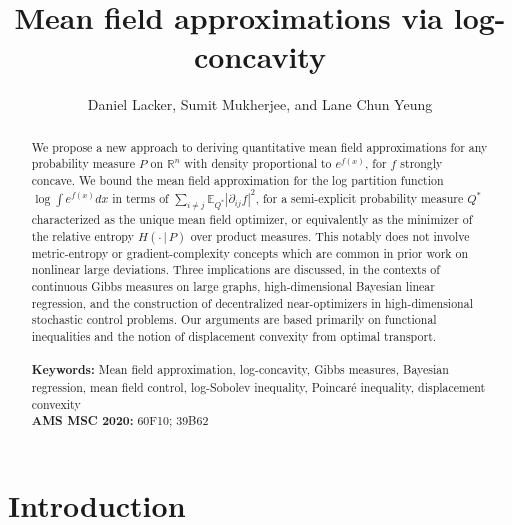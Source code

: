 \documentclass[11pt,reqno]{amsart}
\title{Mean field approximations via log-concavity}
\author{Daniel Lacker, Sumit Mukherjee, and Lane Chun Yeung}
\numberwithin{equation}{section}
\theoremstyle{definition}
\def\E{{\mathbb E}}
\def\R{{\mathbb R}}
\begin{document}
	\begin{abstract}
	We propose a new approach to deriving quantitative mean field approximations for any probability measure $P$ on $\R^n$ with density proportional to $e^{f(x)}$, for $f$ strongly  concave. We bound the mean field approximation for the log partition function $\log \int e^{f(x)}dx$ in terms of $\sum_{i \neq j}\E_{Q^*}|\partial_{ij}f|^2$, for a semi-explicit probability measure $Q^*$ characterized as the unique mean field optimizer, or equivalently as the minimizer of the relative entropy $H(\cdot\,|\,P)$ over product measures. This notably does not involve metric-entropy or gradient-complexity concepts which are common in prior work on nonlinear large deviations. Three implications are discussed, in the contexts of continuous Gibbs measures on large graphs, high-dimensional Bayesian linear regression, and the construction of decentralized near-optimizers in high-dimensional stochastic control problems. Our arguments are based primarily on functional inequalities and the notion of displacement convexity from optimal transport.\\
	\\
	\textbf{Keywords:} Mean field approximation, log-concavity, Gibbs measures, Bayesian regression, mean field control, log-Sobolev inequality, Poincar\'e inequality, displacement convexity\\
	\textbf{AMS MSC 2020:} 60F10; 39B62
\end{abstract}

\maketitle


\section{Introduction} \label{sec: setup}
\end{document}
